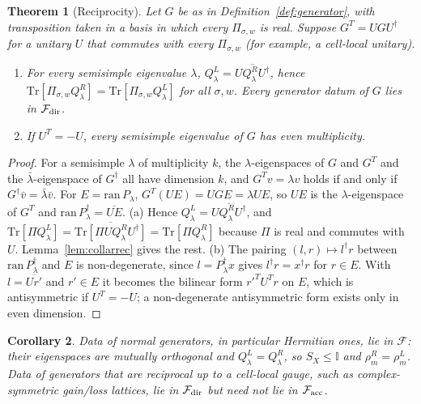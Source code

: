 \documentclass[11pt]{article}
\newtheorem{theorem}{Theorem}
\newtheorem{corollary}[theorem]{Corollary}
\theoremstyle{definition}
\theoremstyle{remark}
\newcommand{\Tr}{\mathrm{Tr}}
\newcommand{\one}{\mathbb{I}}
\newcommand{\Free}{\mathcal{F}}
\begin{document}
\begin{theorem}[Reciprocity]\label{thm:recip}
Let $G$ be as in Definition~\ref{def:generator}, with transposition taken in a basis in which every $\Pi_{\sigma,w}$ is real. Suppose $G^{T}=UGU^\dagger$ for a unitary $U$ that commutes with every $\Pi_{\sigma,w}$ (for example, a cell-local unitary).
\begin{enumerate}
\item[(a)] For every semisimple eigenvalue $\lambda$, $Q^L_\lambda=\overline{UQ^R_\lambda U^\dagger}$, hence $\Tr[\Pi_{\sigma,w}Q^R_\lambda]=\Tr[\Pi_{\sigma,w}Q^L_\lambda]$ for all $\sigma,w$. Every generator datum of $G$ lies in $\Free_{\rm dir}$.
\item[(b)] If $U^{T}=-U$, every semisimple eigenvalue of $G$ has even multiplicity.
\end{enumerate}
\end{theorem}
\begin{proof}
For a semisimple $\lambda$ of multiplicity $k$, the $\lambda$-eigenspaces of $G$ and $G^T$ and the $\bar\lambda$-eigenspace of $G^\dagger$ all have dimension $k$, and $G^Tv=\lambda v$ holds if and only if $G^\dagger\bar v=\bar\lambda\bar v$. For $E=\mathrm{ran}\,P_\lambda$, $G^T(UE)=UGE=\lambda UE$, so $UE$ is the $\lambda$-eigenspace of $G^T$ and $\mathrm{ran}\,P_\lambda^\dagger=\overline{UE}$.
(a) Hence $Q^L_\lambda=\overline{UQ^R_\lambda U^\dagger}$, and $\Tr[\Pi Q^L_\lambda]=\overline{\Tr[\Pi UQ^R_\lambda U^\dagger]}=\Tr[\Pi Q^R_\lambda]$ because $\Pi$ is real and commutes with $U$. Lemma~\ref{lem:collarrec} gives the rest.
(b) The pairing $(l,r)\mapsto l^\dagger r$ between $\mathrm{ran}\,P_\lambda^\dagger$ and $E$ is non-degenerate, since $l=P_\lambda^\dagger x$ gives $l^\dagger r=x^\dagger r$ for $r\in E$. With $l=\overline{Ur'}$ and $r'\in E$ it becomes the bilinear form $r'^TU^Tr$ on $E$, which is antisymmetric if $U^T=-U$; a non-degenerate antisymmetric form exists only in even dimension.
\end{proof}

\begin{corollary}\label{cor:hermitian}
Data of normal generators, in particular Hermitian ones, lie in $\Free$: their eigenspaces are mutually orthogonal and $Q^L_\lambda=Q^R_\lambda$, so $S_X\le\one$ and $\rho^R_m=\rho^L_m$. Data of generators that are reciprocal up to a cell-local gauge, such as complex-symmetric gain/loss lattices, lie in $\Free_{\rm dir}$ but need not lie in $\Free_{\rm acc}$.
\end{corollary}
\end{document}
